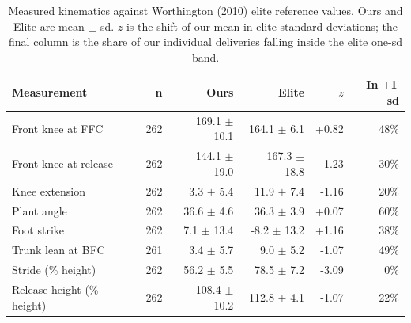 \begin{table}[htbp]
  \centering
  \caption{Measured kinematics against Worthington (2010) elite reference values. Ours and Elite are mean $\pm$ sd. $z$ is the shift of our mean in elite standard deviations; the final column is the share of our individual deliveries falling inside the elite one-sd band.}
  \label{tab:measurements}
  \footnotesize
  \begin{tabular}{lrrrrr}
    \toprule
    Measurement & n & Ours & Elite & $z$ & In $\pm$1\,sd \\
    \midrule
    Front knee at FFC & 262 & 169.1 $\pm$ 10.1 & 164.1 $\pm$ 6.1 & +0.82 & 48\% \\
    Front knee at release & 262 & 144.1 $\pm$ 19.0 & 167.3 $\pm$ 18.8 & -1.23 & 30\% \\
    Knee extension & 262 & 3.3 $\pm$ 5.4 & 11.9 $\pm$ 7.4 & -1.16 & 20\% \\
    Plant angle & 262 & 36.6 $\pm$ 4.6 & 36.3 $\pm$ 3.9 & +0.07 & 60\% \\
    Foot strike & 262 & 7.1 $\pm$ 13.4 & -8.2 $\pm$ 13.2 & +1.16 & 38\% \\
    Trunk lean at BFC & 261 & 3.4 $\pm$ 5.7 & 9.0 $\pm$ 5.2 & -1.07 & 49\% \\
    Stride (\% height) & 262 & 56.2 $\pm$ 5.5 & 78.5 $\pm$ 7.2 & -3.09 & 0\% \\
    Release height (\% height) & 262 & 108.4 $\pm$ 10.2 & 112.8 $\pm$ 4.1 & -1.07 & 22\% \\
    \bottomrule
  \end{tabular}
\end{table}
